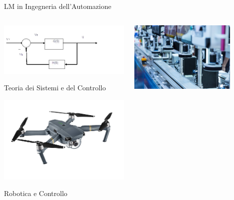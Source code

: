 \documentclass{beamer}
\begin{document}
	\begin{frame}{LM in Ingegneria dell'Automazione}
		\begin{columns}
			\begin{column}{0.4\textwidth}
				\centering
				\includegraphics[width=\textwidth]{sistemi.png}

				Teoria dei Sistemi e del Controllo

				\vspace{0.5cm}
				\includegraphics[width=\textwidth]{robotica_aut.png}

				Robotica e Controllo
			\end{column}
			\begin{column}{0.4\textwidth}
				\centering
				\includegraphics[width=0.8\textwidth]{industriale.jpeg}


\end{column}
\end{columns}
\end{frame}
\end{document}
